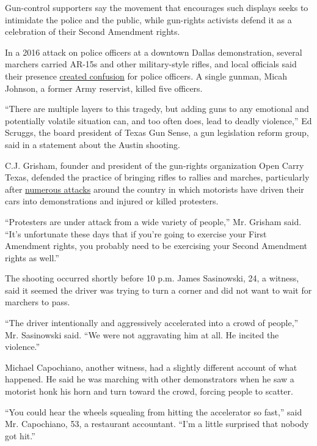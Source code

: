 Gun-control supporters say the movement that encourages such displays
seeks to intimidate the police and the public, while gun-rights
activists defend it as a celebration of their Second Amendment rights.

In a 2016 attack on police officers at a downtown Dallas demonstration,
several marchers carried AR-15s and other military-style rifles, and
local officials said their presence
\href{https://www.nytimes3xbfgragh.onion/2016/07/11/us/texas-open-carry-laws-blurred-lines-between-suspects-and-marchers.html}{created
confusion} for police officers. A single gunman, Micah Johnson, a former
Army reservist, killed five officers.

``There are multiple layers to this tragedy, but adding guns to any
emotional and potentially volatile situation can, and too often does,
lead to deadly violence,'' Ed Scruggs, the board president of Texas Gun
Sense, a gun legislation reform group, said in a statement about the
Austin shooting.

C.J. Grisham, founder and president of the gun-rights organization Open
Carry Texas, defended the practice of bringing rifles to rallies and
marches, particularly after
\href{https://www.nytimes3xbfgragh.onion/2020/07/09/us/bloomington-vauhxx-booker-car-protesters.html}{numerous
attacks} around the country in which motorists have driven their cars
into demonstrations and injured or killed protesters.

``Protesters are under attack from a wide variety of people,'' Mr.
Grisham said. ``It's unfortunate these days that if you're going to
exercise your First Amendment rights, you probably need to be exercising
your Second Amendment rights as well.''

The shooting occurred shortly before 10 p.m. James Sasinowski, 24, a
witness, said it seemed the driver was trying to turn a corner and did
not want to wait for marchers to pass.

``The driver intentionally and aggressively accelerated into a crowd of
people,'' Mr. Sasinowski said. ``We were not aggravating him at all. He
incited the violence.''

Michael Capochiano, another witness, had a slightly different account of
what happened. He said he was marching with other demonstrators when he
saw a motorist honk his horn and turn toward the crowd, forcing people
to scatter.

``You could hear the wheels squealing from hitting the accelerator so
fast,'' said Mr. Capochiano, 53, a restaurant accountant. ``I'm a little
surprised that nobody got hit.''

